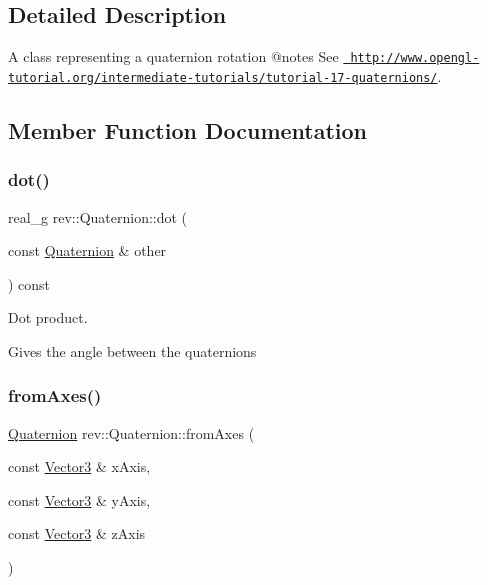 \subsection{Detailed Description}
A class representing a quaternion rotation @notes See \href{http://www.opengl-tutorial.org/intermediate-tutorials/tutorial-17-quaternions/}{\texttt{ http\+://www.\+opengl-\/tutorial.\+org/intermediate-\/tutorials/tutorial-\/17-\/quaternions/}}. 

\subsection{Member Function Documentation}
\mbox{\label{classrev_1_1_quaternion_a3a048d2bc01cf013dfad568dab996e06}} 
\subsubsection{\texorpdfstring{dot()}{dot()}}
{\footnotesize\ttfamily real\+\_\+g rev\+::\+Quaternion\+::dot (\begin{DoxyParamCaption}\item[{const \mbox{\hyperlink{classrev_1_1_quaternion}{Quaternion}} \&}]{other }\end{DoxyParamCaption}) const}



Dot product. 

Gives the angle between the quaternions \mbox{\label{classrev_1_1_quaternion_abfe160e55cb0a142af8fec5afc038188}} 
\subsubsection{\texorpdfstring{fromAxes()}{fromAxes()}}
{\footnotesize\ttfamily \mbox{\hyperlink{classrev_1_1_quaternion}{Quaternion}} rev\+::\+Quaternion\+::from\+Axes (\begin{DoxyParamCaption}\item[{const \mbox{\hyperlink{classrev_1_1_vector}{Vector3}} \&}]{x\+Axis,  }\item[{const \mbox{\hyperlink{classrev_1_1_vector}{Vector3}} \&}]{y\+Axis,  }\item[{const \mbox{\hyperlink{classrev_1_1_vector}{Vector3}} \&}]{z\+Axis }\end{DoxyParamCaption})\hspace{0.3cm}{\ttfamily [static]}}



